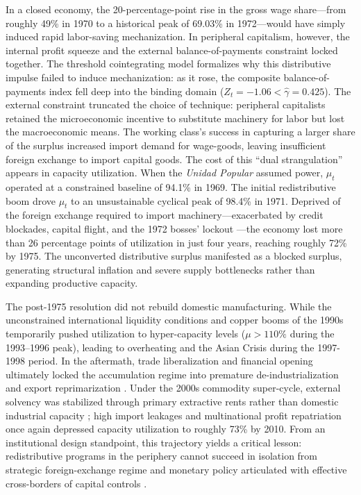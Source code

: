 In a closed economy, the 20-percentage-point rise in the gross wage share---from roughly 49\% in 1970 to a historical peak of 69.03\% in 1972---would have simply induced rapid labor-saving mechanization. In peripheral capitalism, however, the internal profit squeeze and the external balance-of-payments constraint locked together. The threshold cointegrating model formalizes why this distributive impulse failed to induce mechanization: as it rose, the composite balance-of-payments index fell deep into the binding domain ($Z_t = -1.06 < \hat{\gamma} = 0.425$). The external constraint truncated the choice of technique: peripheral capitalists retained the microeconomic incentive to substitute machinery for labor but lost the macroeconomic means. The working class's success in capturing a larger share of the surplus increased import demand for wage-goods, leaving insufficient foreign exchange to import capital goods. The cost of this ``dual strangulation'' appears in capacity utilization. When the \textit{Unidad Popular} assumed power, $\mu_t$ operated at a constrained baseline of 94.1\% in 1969. The initial redistributive boom drove $\mu_t$ to an unsustainable cyclical peak of 98.4\% in 1971. Deprived of the foreign exchange required to import machinery---exacerbated by credit blockades, capital flight, and the 1972 bosses' lockout \citep{DeVylder1976}---the economy lost more than 26 percentage points of utilization in just four years, reaching roughly 72\% by 1975. The unconverted distributive surplus manifested as a blocked surplus, generating structural inflation and severe supply bottlenecks rather than expanding productive capacity. 

The post-1975 resolution did not rebuild domestic manufacturing. While the unconstrained international liquidity conditions and copper booms of the 1990s temporarily pushed utilization to hyper-capacity levels ($\mu > 110\%$ during the 1993--1996 peak), leading to overheating and the Asian Crisis during the 1997-1998 period. In the aftermath, trade liberalization and financial opening ultimately locked the accumulation regime into premature de-industrialization and export reprimarization \citep{Palma2019}. Under the 2000s commodity super-cycle, external solvency was stabilized through primary extractive rents rather than domestic industrial capacity \citep{Torres2022, Ahumada2026}; high import leakages and multinational profit repatriation once again depressed capacity utilization to roughly 73\% by 2010. From an institutional design standpoint, this trajectory yields a critical lesson: redistributive programs in the periphery cannot succeed in isolation from strategic foreign-exchange regime and monetary policy articulated with effective cross-borders of capital controls \citep{Ffrench2018}. 

